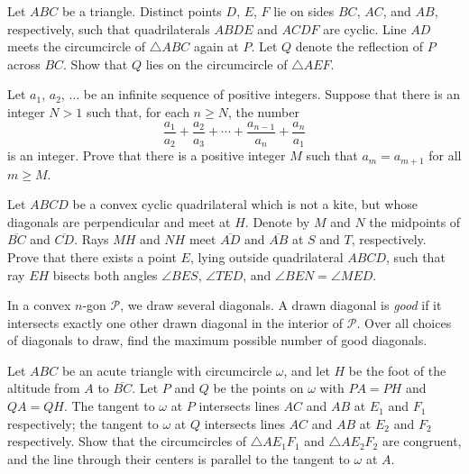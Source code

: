 \documentclass[11pt]{scrartcl}
\begin{document}
\begin{problem}[9162230842142232349]
Let $ABC$ be a triangle. Distinct points $D$, $E$, $F$ lie on sides $BC$, $AC$, and $AB$, respectively, such that quadrilaterals $ABDE$ and $ACDF$ are cyclic. Line $AD$ meets the circumcircle of $\triangle ABC$ again at $P$. Let $Q$ denote the reflection of $P$ across $BC$. Show that $Q$ lies on the circumcircle of $\triangle AEF$.
\end{problem}
\begin{problem}[402654566950359]
Let $a_1$, $a_2$, $\ldots$ be an infinite sequence of positive integers. Suppose that there is an integer $N > 1$ such that, for each $n \geq N$, the number
$$\frac{a_1}{a_2} + \frac{a_2}{a_3} + \cdots + \frac{a_{n-1}}{a_n} + \frac{a_n}{a_1}$$is an integer. Prove that there is a positive integer $M$ such that $a_m = a_{m+1}$ for all $m \geq M$.
\end{problem}
\begin{problem}[102296866595865]
	Let $ABCD$ be a convex cyclic quadrilateral which is not a kite, but whose diagonals are perpendicular and meet at $H$. Denote by $M$ and $N$ the midpoints of $\overline{BC}$ and $\overline{CD}$. Rays $MH$ and $NH$ meet $\overline{AD}$ and $\overline{AB}$ at $S$ and $T$, respectively. Prove that there exists a point $E$, lying outside quadrilateral $ABCD$, such that
ray $EH$ bisects both angles $\angle BES$, $\angle TED$, and
$\angle BEN = \angle MED$.
\end{problem}
\begin{problem}[193788212098506]
  In a convex $n$-gon $\mathcal P$, we draw several diagonals.
  A drawn diagonal is \emph{good} if it intersects
  exactly one other drawn diagonal in the interior of $\mathcal P$.
  Over all choices of diagonals to draw,
  find the maximum possible number of good diagonals.
\end{problem}
\begin{problem}[942176258255049]
Let $ABC$ be an acute triangle with circumcircle $\omega$, and let $H$ be the foot of the altitude from $A$ to $\overline{BC}$. Let $P$ and $Q$ be the points on $\omega$ with $PA = PH$ and $QA = QH$. The tangent to $\omega$ at $P$ intersects lines $AC$ and $AB$ at $E_1$ and $F_1$ respectively; the tangent to $\omega$ at $Q$ intersects lines $AC$ and $AB$ at $E_2$ and $F_2$ respectively. Show that the circumcircles of $\triangle AE_1F_1$ and $\triangle AE_2F_2$ are congruent, and the line through their centers is parallel to the tangent to $\omega$ at $A$.
\end{problem}
\end{document}
